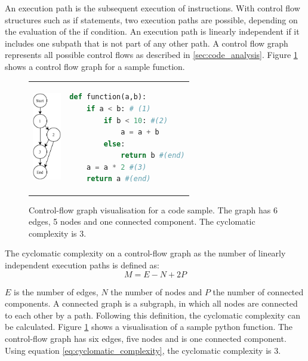 An execution path is the subsequent execution of instructions. With control flow structures such as if statements, two execution paths are possible, depending on the evaluation of the if condition. An execution path is linearly independent if it includes one subpath that is not part of any other path. A control flow graph represents all possible control flows as described in \ref{sec:code_analysis}. Figure \ref{fig:background_control_flow_graph} shows a control flow graph for a sample function.

\begin{figure}
\begin{tabular}{p{}p{}}
    \begin{minipage}{0.45\textwidth}
        \centering
    \includegraphics[height=1.5in]{img/Background/control-flow-graph.pdf}
    \label{fig:background_control_flow_graph_image}
    \end{minipage}
&
\begin{minipage}[c]{0.45\textwidth}
\centering
\begin{lstlisting}[language=Python, label=lst:background_control_flow_graph_listing]
def function(a,b):
    if a < b: # (1)
        if b < 10: #(2)
            a = a + b
        else:
            return b #(end)
    a = a * 2 #(3)
    return a #(end)
\end{lstlisting}
\end{minipage}
\end{tabular}
\caption[Control-flow graph visualisation for a code sample]{Control-flow graph visualisation for a code sample. The graph has 6 edges, 5 nodes and one connected component. The cyclomatic complexity is 3. }
\label{fig:background_control_flow_graph}
\end{figure}

The cyclomatic complexity on a control-flow graph as the number of linearly independent execution paths is defined as:
\begin{equation}\label{eq:cyclomatic_complexity}
M = E - N + 2P
\end{equation}

$E$ is the number of edges, $N$ the number of nodes and $P$ the number of connected components.  A connected graph is a subgraph, in which all nodes are connected to each other by a path. Following this definition, the cyclomatic complexity can be calculated. Figure \ref{fig:background_control_flow_graph} shows a visualisation of a sample python function. The control-flow graph has six edges, five nodes and is one connected component. Using equation \ref{eq:cyclomatic_complexity}, the cyclomatic complexity is 3.

